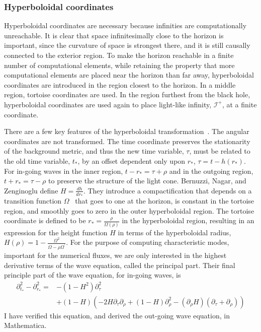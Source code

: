 \subsubsection{Hyperboloidal coordinates}  
Hyperboloidal coordinates are necessary because infinities are computationally unreachable. It is clear that space infinitesimally close to the horizon is important, since the curvature of space is strongest there, and it is still causally connected to the exterior region. To make the horizon reachable in a finite number of computational elements, while retaining the property that more computational elements are placed near the horizon than far away, hyperboloidal coordinates are introduced in the region closest to the horizon. In a middle region, tortoise coordinates are used. In the region furthest from the black hole, hyperboloidal coordinates are used again to place light-like infinity, $\mathcal{I}^+$, at a finite coordinate. 



There are a few key features of the hyperboloidal transformation~\cite{hyperboloidalcoordinates}. The angular coordinates are not transformed. The time coordinate preserves the stationarity of the background metric, and thus the new time variable, $\tau$, must be related to the old time variable, $t_*$, by an offset dependent only upon $r_*$, $\tau=t-h(r_*)$. For in-going waves in the inner region, $t-r_*=\tau+\rho$ and in the outgoing region, $t+r_*=\tau-\rho$ to preserve the structure of the light cone. Bernuzzi, Nagar, and Zenginoglu define $H=\frac{dh}{dr_*}$. They introduce a compactification that depends on a transition function $\Omega$~\cite{OmegaTransferFunction} that goes to one at the horizon, is constant in the tortoise region, and smoothly goes to zero in the outer hyperboloidal region. The tortoise coordinate is defined to be  $r_*=\frac{\rho}{\Omega(\rho)}$ in the hyperboloidal region, resulting in an expression for the height function $H$ in terms of the hyperboloidal radius,  $H(\rho)=1-\frac{\Omega^2}{\Omega-\rho\Omega^\prime}$. For the purpose of computing characteristic modes, important for the numerical fluxes, we are only interested in the highest derivative terms of the wave equation, called the principal part. Their final principle part of the wave equation, for in-going waves, is~\cite{bernuzzi_nagar_zenginoglu_hyperb}
  \begin{eqnarray}
    \partial_{t_*}^2-\partial_{r_*}^2=&-(1-H^2)\partial_\tau^2\nonumber\\
    &+(1-H)(-2H\partial_\tau\partial_\rho+(1-H)\partial_\rho^2-(\partial_\rho H)(\partial_\tau+\partial_\rho))
  \end{eqnarray}    
I have verified this equation, and derived the out-going wave equation, in Mathematica.

